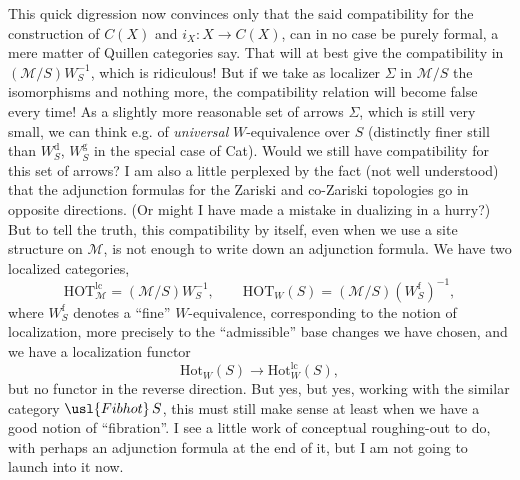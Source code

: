 This quick digression now convinces only that the said compatibility for the construction of $C(X)$ and $i_X : X \longrightarrow C(X)$, can in no case be purely formal, a mere matter of Quillen categories say. That will at best give the compatibility in $(\mathcal{M}/S)W_S^{-1}$, which is ridiculous! But if we take as localizer $\Sigma$ in $\mathcal{M}/S$ the isomorphisms and nothing more, the compatibility relation will become false every time! As a slightly more reasonable set of arrows $\Sigma$, which is still very small, we can think e.g. of \textit{universal} $W$-equivalence over $S$ (distinctly finer still than $W_S^{\mathrm{d}}$, $W_S^{\mathrm{g}}$ in the special case of Cat). Would we still have compatibility for this set of arrows? I am also a little perplexed by the fact (not well understood) that the adjunction formulas for the Zariski and co-Zariski topologies go in opposite directions. (Or might I have made a mistake in dualizing in a hurry?) But to tell the truth, this compatibility by itself, even when we use a site structure on $\mathcal{M}$, is not enough to write down an adjunction formula. We have two localized categories, %
\[
\mathrm{HOT}^{\mathrm{lc}}_{\mathcal{M}} = (\mathcal{M}/S)W_S^{-1}, \qquad \mathrm{HOT}_W(S) = (\mathcal{M}/S)(W_S^{\mathrm{f}})^{-1},
\]
where $W_S^{\mathrm{f}}$ denotes a ``fine'' $W$-equivalence, corresponding to the notion of localization, more precisely to the ``admissible'' base changes we have chosen, and we have a localization functor
\[
\mathrm{Hot}_W(S) \longrightarrow \mathrm{Hot}^{\mathrm{lc}}_{W}(S),
\]
but no functor in the reverse direction. But yes, but yes, working with the similar category $\usl{Fibhot}\,S$, this must still make sense at least when we have a good notion of ``fibration''. I see a little work of conceptual roughing-out to do, with perhaps an adjunction formula at the end of it, but I am not going to launch into it now.